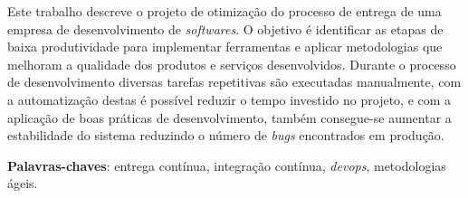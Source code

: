 \documentclass[
	12pt,				%
	openright,			%
	oneside,			%
	a4paper,			%
	english,			%
	french,				%
	spanish,			%
	brazil,				%
	]{abntex2}
\begin{document}

\frenchspacing 


\imprimircapa

\imprimirfolhaderosto*



\setlength{\absparsep}{18pt} %
\begin{resumo}
 Este trabalho descreve o projeto de otimização do processo de entrega de uma empresa de desenvolvimento de \textit{softwares}. O objetivo é identificar as etapas de baixa produtividade para implementar ferramentas e aplicar metodologias que melhoram a qualidade dos produtos e serviços desenvolvidos. Durante o processo de desenvolvimento diversas tarefas repetitivas são executadas manualmente, com a automatização destas é possível reduzir o tempo investido no projeto, e com a aplicação de boas práticas de desenvolvimento, também consegue-se aumentar a estabilidade do sistema reduzindo o número de \textit{bugs} encontrados em produção.

 \noindent
 \textbf{Palavras-chaves}: entrega contínua, integração contínua, \textit{devops}, metodologias ágeis.
\end{resumo}


\listoftables*
\end{document}
